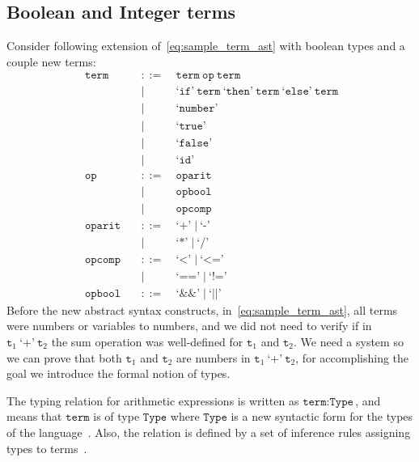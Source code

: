 \documentclass[
  oneside,
  english,
  coorientadorbanca,
  embeddedlogo,
  noabntexcite
]{ufsc-thesis-rn46-2019}
\newcommand{\bnfvar}[1]{\ \bnfvars{#1}}
\newcommand{\bnfvars}[1]{\texttt{#1}}
\newcommand{\bnfter}[1]{\ \bnfters{#1}}
\newcommand{\bnfters}[1]{\textrm{`}\texttt{#1}\textrm{'}}
\newcommand{\bnfor}[1]{\;\mid{} #1}
\newcommand{\bnfprod}[2]{\bnfvars{#1} &\ &::= & #2}
\newcommand{\bnfmore}[1]{ && \mid{} & #1}
\begin{document}
\subsection{Boolean and Integer terms}

Consider following extension of~\eqref{eq:sample_term_ast} with boolean types and a couple new terms:
\begin{equation}~\label{eq:sample_term_ast_bool}
  \begin{alignedat}{2}
    \bnfprod{term}{\bnfvar{term} \bnfvar{op} \bnfvar{term}} \\
    \bnfmore{\bnfter{if} \bnfvar{term} \bnfter{then} \bnfvar{term} \bnfter{else} \bnfvar{term}} \\
    \bnfmore{\bnfter{number}}                              \\
    \bnfmore{\bnfter{true}}                              \\
    \bnfmore{\bnfter{false}}                              \\
    \bnfmore{\bnfter{id}} \\
    \bnfprod{op}{\bnfvar{oparit}} \\
    \bnfmore{\bnfvar{opbool}} \\
    \bnfmore{\bnfvar{opcomp}} \\
    \bnfprod{oparit}{\bnfter{+} \bnfor{\bnfter{-}}} \\
    \bnfmore{\bnfter{*} \bnfor{\bnfter{/}}} \\
    \bnfprod{opcomp}{\bnfter{<} \bnfor{\bnfter{<=}}} \\
    \bnfmore{\bnfter{==} \bnfor{\bnfter{!=}}} \\
    \bnfprod{opbool}{\bnfter{\&\&} \bnfor{\bnfter{||}}}
  \end{alignedat}
\end{equation}
Before the new abstract syntax constructs, in~\eqref{eq:sample_term_ast}, all terms were numbers or variables to numbers, and we did not need to verify if in $\bnfvars{t}_1 \bnfter{+} \bnfvar{t}_2$ the sum operation was well-defined for $\bnfvars{t}_1$ and $\bnfvars{t}_2$.
We need a system so we can prove that both $\bnfvars{t}_1$ and $\bnfvars{t}_2$ are numbers in $\bnfvars{t}_1 \bnfter{+} \bnfvar{t}_2$, for accomplishing the goal we introduce the formal notion of types.

The typing relation for arithmetic expressions is written as $\bnfvars{term} : \bnfvars{Type}$, and means that $\bnfvars{term}$ is of type $\bnfvars{Type}$ where $\bnfvars{Type}$ is a new syntactic form for the types of the language~\cite{pierce2002types}. Also, the relation is defined by a set of inference rules assigning types to terms~\cite{pierce2002types}.
\end{document}
